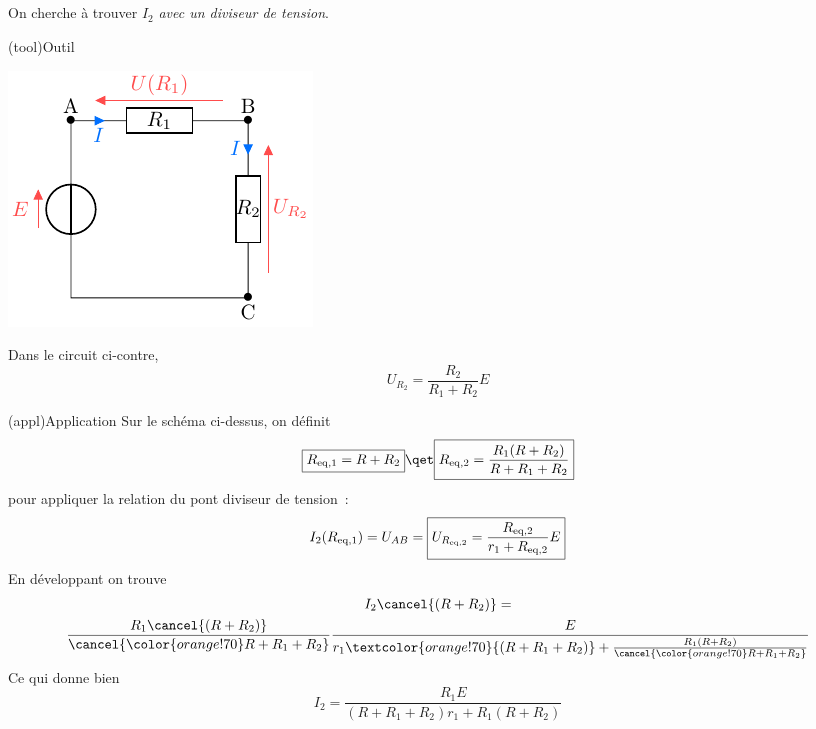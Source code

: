 \documentclass[../../main/main.tex]{subfiles}
\begin{document}
{\begin{tcbraster}[raster columns=2, raster equal height=rows]
\begin{tcb}[]
        \subsection{}
        On cherche à trouver $I_2$ \textit{avec un diviseur de tension}.
    \end{tcb}
    \begin{tcb}[sidebyside, righthand ratio=.4](tool){Outil}
        \begin{center}
            \includegraphics[width=\linewidth]{divtens-rangle}
        \end{center}
        \tcblower
        \begin{center}
            Dans le circuit ci-contre,
            \[ U_{R_2} = \frac{R_2}{R_1+R_2}E\]
        \end{center}
    \end{tcb}
\end{tcbraster}
\begin{tcb}(appl){Application}
    Sur le schéma ci-dessus, on définit
    \[ \boxed{R_{\rm eq,1} = R+R_2} \qet \boxed{R_{\rm eq,2} =
        \frac{R_1(R+R_2)}{R + R_1 + R_2}}\]
    pour appliquer la relation du pont diviseur de tension~:
    \begin{equation*}
        I_2(R_{\rm eq,1}) = U_{AB} =
            \boxed{U_{R_{\rm eq,2}} = \frac{R_{\rm eq,2}}{r_1 + R_{\rm eq,2}}E}
    \end{equation*}
    \tcblower
    En développant on trouve
    \begin{gather*}
        I_2\cancel{(R+R_2)} =\\
            \frac{R_1\cancel{(R+R_2)}}{\cancel{\color{orange!70}R + R_1 + R_2}}
            \frac{E}{r_1 \textcolor{orange!70}{(R+R_1+R_2)}
                    + \frac{R_1(R+R_2)}{\cancel{\color{orange!70}R + R_1 +
                R_2}}}
    \end{gather*}
    Ce qui donne bien
    \begin{equation*}
        \boxed{I_2 = \frac{R_1E}{(R+R_1+R_2)r_1 + R_1(R+R_2)}}
    \end{equation*}
\end{tcb}
}
\end{document}
